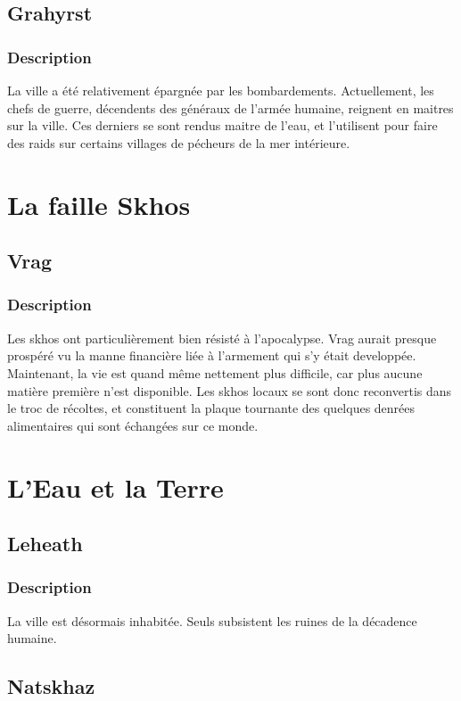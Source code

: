 \subsection{Grahyrst}
\subsubsection{Description}
La ville a été relativement épargnée par les bombardements. Actuellement, les chefs de guerre, décendents des généraux de l'armée humaine, reignent en maitres sur la ville. Ces derniers se sont rendus maitre de l'eau, et l'utilisent pour faire des raids sur certains villages de pécheurs de la mer intérieure.

\section{La faille Skhos}
\subsection{Vrag}
\subsubsection{Description}
Les skhos ont particulièrement bien résisté à l'apocalypse. Vrag aurait presque prospéré vu la manne financière liée à l'armement qui s'y était developpée. Maintenant, la vie est quand même nettement plus difficile, car plus aucune matière première n'est disponible. Les skhos locaux se sont donc reconvertis dans le troc de récoltes, et constituent la plaque tournante des quelques denrées alimentaires qui sont échangées sur ce monde.

\section{L'Eau et la Terre}
\subsection{Leheath}
\subsubsection{Description}
La ville est désormais inhabitée. Seuls subsistent les ruines de la décadence humaine.

\subsection{Natskhaz}
